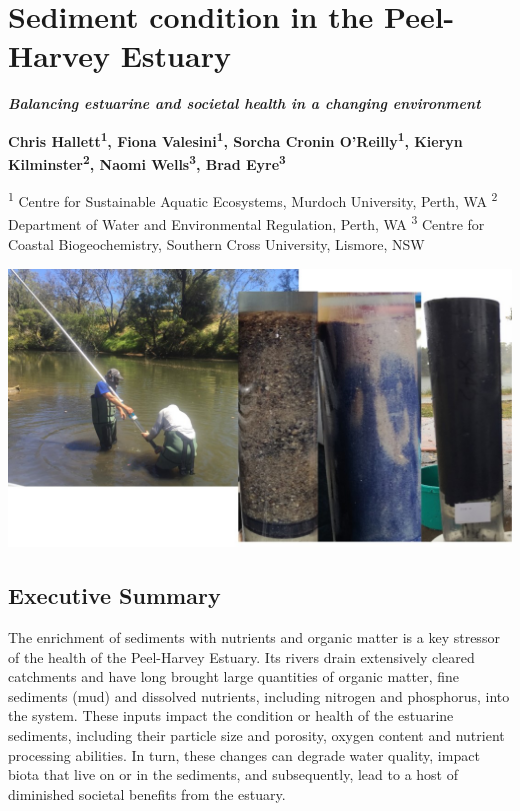 \documentclass[
]{book}
\begin{document}
\hypertarget{sediment-condition-in-the-peel-harvey-estuary}{%
\chapter{Sediment condition in the Peel-Harvey Estuary}\label{sediment-condition-in-the-peel-harvey-estuary}}

{\textbf{\emph{Balancing estuarine and societal health in a changing environment}}}

{\textbf{Chris Hallett\textsuperscript{1}, Fiona Valesini\textsuperscript{1}, Sorcha Cronin O'Reilly\textsuperscript{1}, Kieryn Kilminster\textsuperscript{2}, Naomi Wells\textsuperscript{3}, Brad Eyre\textsuperscript{3}}}

{\textsuperscript{1} Centre for Sustainable Aquatic Ecosystems, Murdoch University, Perth, WA \textsuperscript{2} Department of Water and Environmental Regulation, Perth, WA \textsuperscript{3} Centre for Coastal Biogeochemistry, Southern Cross University, Lismore, NSW}

\includegraphics[width=1\linewidth]{images/sediment/picture1}

\hypertarget{executive-summary-3}{%
\section{Executive Summary}\label{executive-summary-3}}

The enrichment of sediments with nutrients and organic matter is a key stressor of the health of the Peel-Harvey Estuary. Its rivers drain extensively cleared catchments and have long brought large quantities of organic matter, fine sediments (mud) and dissolved nutrients, including nitrogen and phosphorus, into the system. These inputs impact the condition or health of the estuarine sediments, including their particle size and porosity, oxygen content and nutrient processing abilities. In turn, these changes can degrade water quality, impact biota that live on or in the sediments, and subsequently, lead to a host of diminished societal benefits from the estuary.
\end{document}
